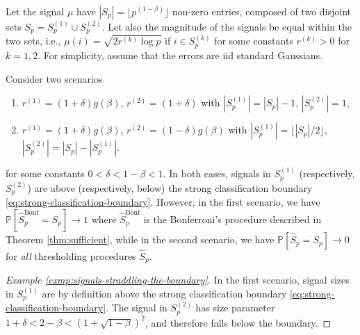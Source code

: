 \begin{example}
\label{exmp:signals-straddling-the-boundary}
Let the signal $\mu$ have $|S_p| = \lfloor p^{(1-\beta)} \rfloor$ non-zero entries, composed of two disjoint sets $S_p = S_p^{(1)}\cup S_p^{(2)}$.
Let also the magnitude of the signals be equal within the two sets, i.e., $\mu(i)=\sqrt{2r^{(k)}\log{p}}$ if $i\in S_p^{(k)}$ for some constants $r^{(k)} > 0$ for $k=1,2$.
For simplicity, assume that the errors are iid standard Gaussians.

Consider two scenarios
\begin{enumerate}
    \item $r^{(1)} = (1+\delta)g(\beta)$, $r^{(2)} = (1+\delta)$ with $|S_p^{(1)}|=|S_p|-1$, $|S_p^{(2)}|=1$, 
    \item $r^{(1)} = (1+\delta)g(\beta)$, $r^{(2)} = (1-\delta)g(\beta)$ with $|S_p^{(1)}|=\lfloor|S_p|/2\rfloor$, $|S_p^{(2)}|=|S_p| - |S_p^{(1)}|$.
\end{enumerate}
for some constants $0<\delta<1-\beta<1$. 
In both cases, signals in $S_p^{(1)}$ (respectively, $S_p^{(2)}$) are above (respectively, below) the strong classification boundary \eqref{eq:strong-classification-boundary}.
However, in the first scenario, we have $\mathbb{P}[\widehat{S}^{\text{Bonf}}_p=S_p]\to 1$ where $\widehat{S}^{\text{Bonf}}_p$ is the Bonferroni's procedure described in Theorem \ref{thm:sufficient}, 
while in the second scenario, we have $\mathbb{P}[\widehat{S}_p=S_p]\to 0$ for \emph{all} thresholding procedures $\widehat{S}_p$.

\begin{proof}[Example \ref{exmp:signals-straddling-the-boundary}]
In the first scenario, signal sizes in $S^{(1)}_p$ are by definition above the strong classification boundary \eqref{eq:strong-classification-boundary}.
The signal in $S^{(2)}_p$ has size parameter $1+\delta<2-\beta<(1+\sqrt{1-\beta})^2$, and therefore falls below the boundary.


\end{proof}
\end{example}
